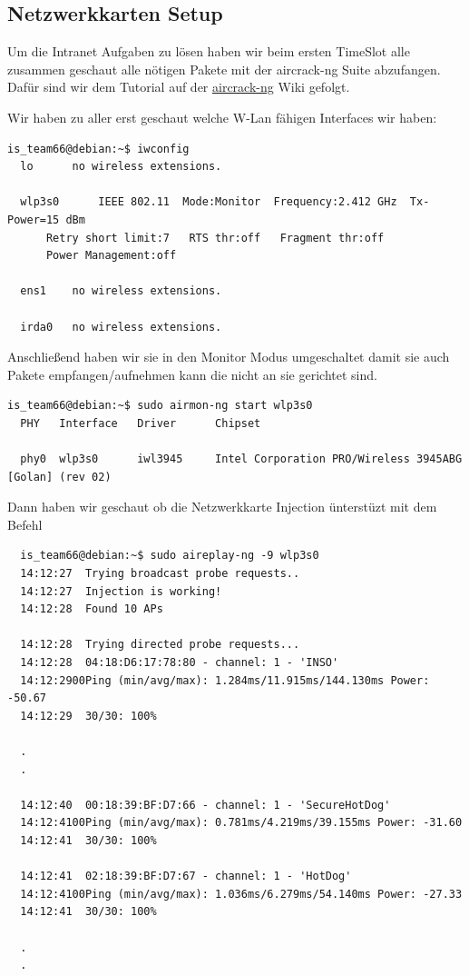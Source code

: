 \documentclass[12pt,a4paper,titlepage,oneside]{scrartcl}
\begin{document}
\subsection{Netzwerkkarten Setup}
Um die Intranet Aufgaben zu lösen haben wir beim ersten TimeSlot alle zusammen geschaut alle nötigen Pakete mit der aircrack-ng Suite abzufangen. Dafür sind wir dem Tutorial auf der \href{https://www.aircrack-ng.org/doku.php?id=cracking_wpa}{aircrack-ng} Wiki gefolgt.

Wir haben zu aller erst geschaut welche W-Lan fähigen Interfaces wir haben:

\begin{lstlisting}
is_team66@debian:~$ iwconfig
  lo	  no wireless extensions.
  
  wlp3s0	  IEEE 802.11  Mode:Monitor  Frequency:2.412 GHz  Tx-Power=15 dBm
      Retry short limit:7	RTS thr:off   Fragment thr:off
      Power Management:off
  
  ens1	  no wireless extensions.
  
  irda0	  no wireless extensions.
\end{lstlisting}

Anschließend haben wir sie in den Monitor Modus umgeschaltet damit sie auch Pakete empfangen/aufnehmen kann die nicht an sie gerichtet sind.

\begin{lstlisting}
is_team66@debian:~$ sudo airmon-ng start wlp3s0
  PHY	Interface	Driver		Chipset
  
  phy0	wlp3s0		iwl3945 	Intel Corporation PRO/Wireless 3945ABG [Golan] (rev 02)
\end{lstlisting}

Dann haben wir geschaut ob die Netzwerkkarte Injection ünterstüzt mit dem Befehl

\begin{lstlisting}
  is_team66@debian:~$ sudo aireplay-ng -9 wlp3s0
  14:12:27  Trying broadcast probe requests..
  14:12:27  Injection is working!
  14:12:28  Found 10 APs
  
  14:12:28  Trying directed probe requests...
  14:12:28  04:18:D6:17:78:80 - channel: 1 - 'INSO'
  14:12:2900Ping (min/avg/max): 1.284ms/11.915ms/144.130ms Power: -50.67
  14:12:29  30/30: 100%
  
  .
  .
  
  14:12:40  00:18:39:BF:D7:66 - channel: 1 - 'SecureHotDog'
  14:12:4100Ping (min/avg/max): 0.781ms/4.219ms/39.155ms Power: -31.60
  14:12:41  30/30: 100%
  
  14:12:41  02:18:39:BF:D7:67 - channel: 1 - 'HotDog'
  14:12:4100Ping (min/avg/max): 1.036ms/6.279ms/54.140ms Power: -27.33
  14:12:41  30/30: 100%
  
  .
  .
\end{lstlisting}
\end{document}

